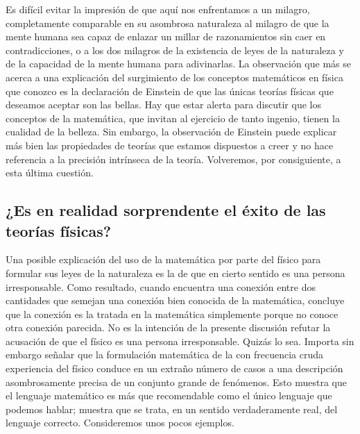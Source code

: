 \documentclass[a4paper, 12pt]{article}
\begin{document}
Es difícil evitar la impresión de que aquí nos enfrentamos a un milagro, completamente comparable en su asombrosa naturaleza al milagro de que la mente humana sea capaz de enlazar un millar de razonamientos sin caer en contradicciones, o a los dos milagros de la existencia de leyes de la naturaleza y de la capacidad de la mente humana para adivinarlas. La observación que más se acerca a una explicación del surgimiento de los conceptos matemáticos en física que conozco es la declaración de Einstein de que las únicas teorías físicas que deseamos aceptar son las bellas. Hay que estar alerta para discutir que los conceptos de la matemática, que invitan al ejercicio de tanto ingenio, tienen la cualidad de la belleza. Sin embargo, la observación de Einstein puede explicar más bien las propiedades de teorías que estamos dispuestos a creer y no hace referencia a la precisión intrínseca de la teoría. Volveremos, por consiguiente, a esta última cuestión.

\subsection*{¿Es en realidad sorprendente el éxito de las teorías físicas?}

Una posible explicación del uso de la matemática por parte del físico para formular sus leyes de la naturaleza es la de que en cierto sentido es una persona irresponsable. Como resultado, cuando encuentra una conexión entre dos cantidades que semejan una conexión bien conocida de la matemática, concluye que la conexión es la tratada en la matemática simplemente porque no conoce otra conexión parecida. No es la intención de la presente discusión refutar la acusación de que el físico es una persona irresponsable. Quizás lo sea. Importa sin embargo señalar que la formulación matemática de la con frecuencia cruda experiencia del físico conduce en un extraño número de casos a una descripción asombrosamente precisa de un conjunto grande de fenómenos. Esto muestra que el lenguaje matemático es más que recomendable como el único lenguaje que podemos hablar; muestra que se trata, en un sentido verdaderamente real, del lenguaje correcto. Consideremos unos pocos ejemplos.
\end{document}
